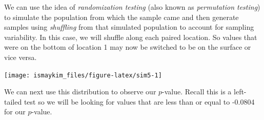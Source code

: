 \documentclass[]{tufte-book}
\newenvironment{Shaded}{\begin{snugshade}}{\end{snugshade}}
\newcommand{\KeywordTok}[1]{\textcolor[rgb]{0.13,0.29,0.53}{\textbf{{#1}}}}
\newcommand{\DataTypeTok}[1]{\textcolor[rgb]{0.13,0.29,0.53}{{#1}}}
\newcommand{\DecValTok}[1]{\textcolor[rgb]{0.00,0.00,0.81}{{#1}}}
\newcommand{\StringTok}[1]{\textcolor[rgb]{0.31,0.60,0.02}{{#1}}}
\newcommand{\NormalTok}[1]{{#1}}
\theoremstyle{definition}
\theoremstyle{definition}
\theoremstyle{remark}
\begin{document}
We can use the idea of \emph{randomization testing} (also known as
\emph{permutation testing}) to simulate the population from which the
sample came and then generate samples using \emph{shuffling} from that
simulated population to account for sampling variability. In this case,
we will shuffle along each paired location. So values that were on the
bottom of location 1 may now be switched to be on the surface or vice
versa.

\begin{Shaded}
\end{Shaded}

\begin{center}\texttt{[image: ismaykim\_files/figure-latex/sim5-1]} \end{center}

We can next use this distribution to observe our \(p\)-value. Recall
this is a left-tailed test so we will be looking for values that are
less than or equal to -0.0804 for our \(p\)-value.

\begin{Shaded}
\end{Shaded}
\end{document}
